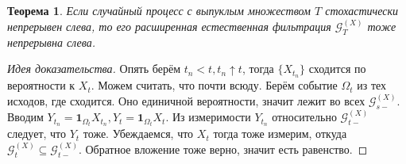 \documentclass[16pt]{article}
\newtheorem{theorem}{Теорема}[section]
\theoremstyle{definition}
\begin{document}
\begin{theorem}
Если случайный процесс с выпуклым множеством $T$ стохастически непрерывен слева, то его расширенная естественная фильтрация $\mathcal{G}_T^{(X)}$ тоже непрерывна слева.
\end{theorem}
\begin{proof}[Идея доказательства]
Опять берём $t_n < t, t_n \uparrow t$, тогда $\{X_{t_n}\}$ сходится по вероятности к $X_t$. Можем считать, что почти всюду. Берём событие $\Omega_t$ из тех исходов, где сходится. Оно единичной вероятности, значит лежит во всех $\mathcal{G}_{s-}^{(X)}$. Вводим $Y_{t_n} = \mathbf{1}_{\Omega_t}X_{t_n}, Y_t = \mathbf{1}_{\Omega_t}X_t$. Из измеримости $Y_{t_n}$ относительно $\mathcal{G}_{t-}^{(X)}$ следует, что $Y_t$ тоже. Убеждаемся, что $X_t$ тогда тоже измерим, откуда $\mathcal{G}_{t}^{(X)} \subseteq \mathcal{G}_{t-}^{(X)}$. Обратное вложение тоже верно, значит есть равенство.
\end{proof}
\end{document}

